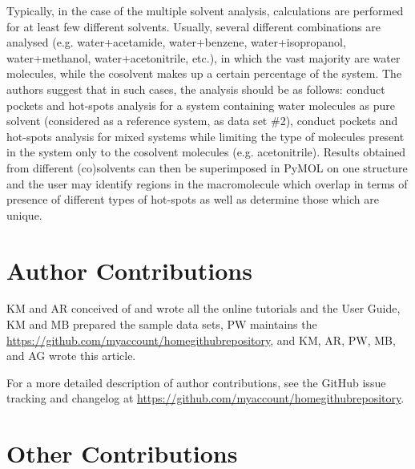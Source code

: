 \documentclass[9pt,tutorial]{livecoms}
\newcommand{\githubrepository}{\url{https://github.com/myaccount/homegithubrepository}}  %
\begin{document}
Typically, in the case of the multiple solvent analysis, calculations are performed for at least few different solvents. Usually, several different combinations are analysed (e.g. water+acetamide, water+benzene, water+isopropanol, water+methanol, water+acetonitrile, etc.), in which the vast majority are water molecules, while the cosolvent makes up a certain percentage of the system. The authors suggest that in such cases, the analysis should be as follows: conduct pockets and hot-spots analysis for a system containing water molecules as pure solvent (considered as a reference system, as data set \#2), conduct pockets and hot-spots analysis for mixed systems while limiting the type of molecules present in the system only to the cosolvent molecules (e.g. acetonitrile). Results obtained from different (co)solvents can then be superimposed in PyMOL on one structure and the user may identify regions in the macromolecule which overlap in terms of presence of different types of hot-spots as well as determine those which are unique.     

\section{Author Contributions}
%

KM and AR conceived of and wrote all the online tutorials and the User Guide, KM and MB prepared the sample data sets, PW maintains the \githubrepository, and KM, AR, PW, MB, and AG wrote this article.

For a more detailed description of author contributions,
see the GitHub issue tracking and changelog at \githubrepository.

\section{Other Contributions}
%
\end{document}
